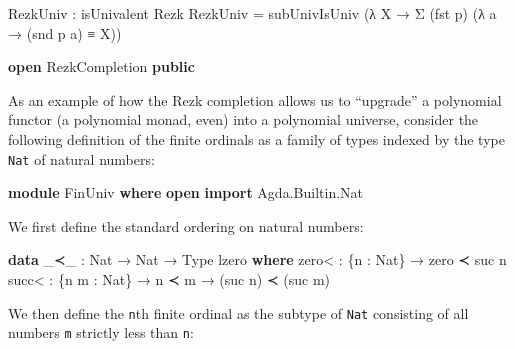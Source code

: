 \documentclass[
  11pt,
  oneside,
  article]{memoir}
\newenvironment{Shaded}{}{}
\newcommand{\KeywordTok}[1]{\textcolor[rgb]{0.00,0.44,0.13}{\textbf{#1}}}
\newcommand{\NormalTok}[1]{#1}
\newcommand{\OtherTok}[1]{\textcolor[rgb]{0.00,0.44,0.13}{#1}}
\theoremstyle{definition}
\theoremstyle{plain}
\newcommand{\0}{\textsf{0}}
\newcommand{\1}{\tn{\textsf{1}}}
\begin{document}
\begin{Shaded}
\begin{Highlighting}[]
\NormalTok{    RezkUniv }\OtherTok{:}\NormalTok{ isUnivalent Rezk}
\NormalTok{    RezkUniv }\OtherTok{=}\NormalTok{ subUnivIsUniv }\OtherTok{(λ}\NormalTok{ X }\OtherTok{→}\NormalTok{ Σ }\OtherTok{(}\NormalTok{fst p}\OtherTok{)} \OtherTok{(λ}\NormalTok{ a }\OtherTok{→} \OtherTok{(}\NormalTok{snd p a}\OtherTok{)}\NormalTok{ ≡ X}\OtherTok{))}

\KeywordTok{open}\NormalTok{ RezkCompletion }\KeywordTok{public}
\end{Highlighting}
\end{Shaded}

As an example of how the Rezk completion allows us to ``upgrade'' a
polynomial functor (a polynomial monad, even) into a polynomial
universe, consider the following definition of the finite ordinals as a
family of types indexed by the type \texttt{Nat} of natural numbers:

\begin{Shaded}
\begin{Highlighting}[]
\KeywordTok{module}\NormalTok{ FinUniv }\KeywordTok{where}
    \KeywordTok{open} \KeywordTok{import}\NormalTok{ Agda}\OtherTok{.}\NormalTok{Builtin}\OtherTok{.}\NormalTok{Nat}
\end{Highlighting}
\end{Shaded}

We first define the standard ordering on natural numbers:

\begin{Shaded}
\begin{Highlighting}[]
    \KeywordTok{data} \OtherTok{\_}\NormalTok{≺}\OtherTok{\_} \OtherTok{:}\NormalTok{ Nat }\OtherTok{→}\NormalTok{ Nat }\OtherTok{→}\NormalTok{ Type lzero }\KeywordTok{where}
\NormalTok{        zero\textless{} }\OtherTok{:} \OtherTok{\{}\NormalTok{n }\OtherTok{:}\NormalTok{ Nat}\OtherTok{\}} \OtherTok{→}\NormalTok{ zero ≺ suc n}
\NormalTok{        succ\textless{} }\OtherTok{:} \OtherTok{\{}\NormalTok{n m }\OtherTok{:}\NormalTok{ Nat}\OtherTok{\}} \OtherTok{→}\NormalTok{ n ≺ m }\OtherTok{→} \OtherTok{(}\NormalTok{suc n}\OtherTok{)}\NormalTok{ ≺ }\OtherTok{(}\NormalTok{suc m}\OtherTok{)}
\end{Highlighting}
\end{Shaded}

We then define the \texttt{n}th finite ordinal as the subtype of
\texttt{Nat} consisting of all numbers \texttt{m} strictly less than
\texttt{n}:
\end{document}
